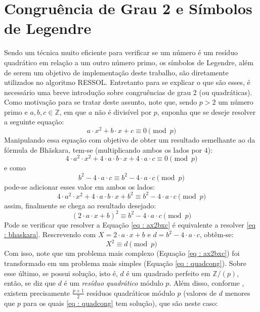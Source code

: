\section{Congruência de Grau 2 e Símbolos de Legendre}
Sendo um técnica muito eficiente para verificar se um número é um resíduo quadrático em relação a um outro número primo, os símbolos de Legendre, além de serem um objetivo de implementação deste trabalho, são diretamente utilizados no algoritmo RESSOL. Entretanto para se explicar o que são esses, é necessário uma breve introdução sobre congruências de grau 2 (ou quadráticas).
Como motivação para se tratar deste assunto, note que, sendo $p > 2$ um número primo e $a, b, c \in \mathbb{Z}$, em que $a$ não é divisível por $p$, suponha que se deseje resolver a seguinte equação:
\begin{equation} \label{eq : ax2bxc}
    a \cdot x^2 + b \cdot x + c \equiv 0 \pmod p
\end{equation}
Manipulando essa equação com objetivo de obter um resultado semelhante ao da fórmula de Bhãskara, tem-se (multiplicando ambos os lados por $4$):
\begin{equation*}
    4 \cdot a^2 \cdot x^2 + 4 \cdot a \cdot b \cdot x + 4 \cdot a \cdot c \equiv 0 \pmod p
\end{equation*}
e como 
\begin{equation*}
    b^2 - 4 \cdot a \cdot c \equiv b^2 - 4 \cdot a \cdot c \pmod p
\end{equation*}
pode-se adicionar esses valor em ambos os lados:
\begin{equation*}
    4 \cdot a^2 \cdot x^2 + 4 \cdot a \cdot b \cdot x + b^2 \equiv b^2 - 4 \cdot a \cdot c \pmod p
\end{equation*}
assim, finalmente se chega ao resultado desejado:
\begin{equation} \label{eq : bhaskara}
    (2 \cdot a \cdot x + b)^2 \equiv b^2 - 4 \cdot a \cdot c \pmod p
\end{equation}
Pode se verificar que resolver a Equação \ref{eq : ax2bxc}  é equivalente a resolver \ref{eq : bhaskara}. Rescrevendo com $X = 2 \cdot a \cdot x + b$ e $d = b^2 - 4 \cdot a \cdot c$, obtêm-se:
\begin{equation} \label{eq : quadcong}
    X^2 \equiv d \pmod p
\end{equation}
Com isso, note que um problema mais complexo (Equação \ref{eq : ax2bxc}) foi transformado em um problema mais simples (Equação \ref{eq : quadcong}). Sobre esse último, se possui solução, isto é, $d$ é um quadrado perfeito em $\mathbb{Z}/(p)$, então, se diz que $d$ é um \textit{resíduo quadrático} módulo $p$. Além disso, conforme \cite{book:2399854}, existem precisamente $\frac{p+1}{2}$ resíduos quadráticos módulo $p$ (valores de $d$ menores que $p$ para os quais \ref{eq : quadcong} tem solução), que são neste caso:
